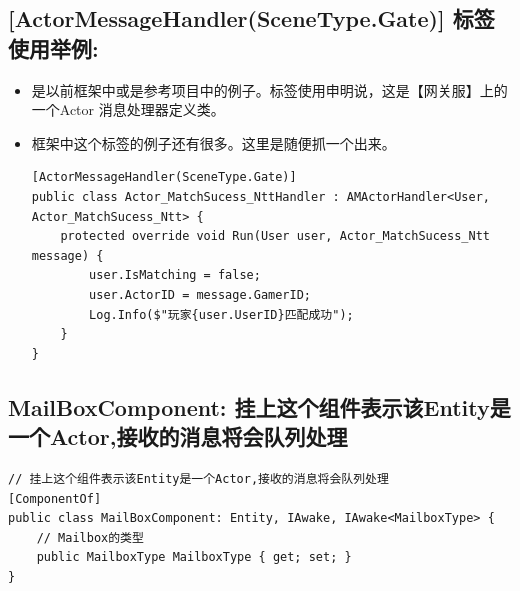 \documentclass[9pt, b5paper]{article}
\begin{document}
\subsection{[ActorMessageHandler(SceneType.Gate)] 标签使用举例:}
\label{sec-2-16}
\begin{itemize}
\item 是以前框架中或是参考项目中的例子。标签使用申明说，这是【网关服】上的一个Actor 消息处理器定义类。
\item 框架中这个标签的例子还有很多。这里是随便抓一个出来。
\begin{verbatim}
[ActorMessageHandler(SceneType.Gate)]
public class Actor_MatchSucess_NttHandler : AMActorHandler<User, Actor_MatchSucess_Ntt> {
    protected override void Run(User user, Actor_MatchSucess_Ntt message) {
        user.IsMatching = false;
        user.ActorID = message.GamerID;
        Log.Info($"玩家{user.UserID}匹配成功");
    }
}
\end{verbatim}
\end{itemize}
\subsection{MailBoxComponent: 挂上这个组件表示该Entity是一个Actor,接收的消息将会队列处理}
\label{sec-2-17}
\begin{verbatim}
// 挂上这个组件表示该Entity是一个Actor,接收的消息将会队列处理
[ComponentOf]
public class MailBoxComponent: Entity, IAwake, IAwake<MailboxType> {
    // Mailbox的类型
    public MailboxType MailboxType { get; set; }
}
\end{verbatim}
\end{document}
